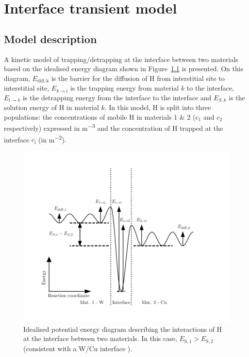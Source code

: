 \chapter{Interface transient model}

\section{Model description}
A kinetic model of trapping/detrapping at the interface between two materials based on the idealised energy diagram shown in Figure~\ref{fig:diagram_E} is presented.
On this diagram, $E_\mathrm{diff,k}$ is the barrier for the diffusion of H from interstitial site to interstitial site, $E_{k\rightarrow \mathrm{i}}$ is the trapping energy from material $k$ to the interface, $E_{\mathrm{i}\rightarrow k}$ is the detrapping energy from the interface to the interface and $E_{S,k}$ is the solution energy of H in material $k$.
In this model, H is split into three populations: the concentrations of mobile H in materials 1 \& 2 ($c_1$ and $c_2$ respectively) expressed in \si{m^{-3}} and the concentration of H trapped at the interface $c_\mathrm{i}$ (in \si{m^{-2}}).
\begin{figure}[ht!]
    \centering
    \includegraphics[width=\linewidth]{Figures/appendix/interface_E.pdf}
    \caption{Idealised potential energy diagram describing the interactions of H at the interface between two materials. In this case, $E_\mathrm{S,1}>E_\mathrm{S,2}$ (consistent with a W/Cu interface ).}
    \label{fig:diagram_E}
\end{figure}
